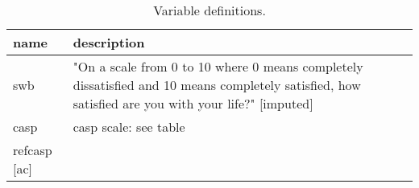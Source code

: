 \begin{table}[H]\centering\footnotesize
 \caption{\label{var_des} Variable definitions.}
\begin{tabular} {p{1.5in}p{4.5in}}   \hline
name & description   \\ \hline
  swb & "On a scale from 0 to 10 where 0 means completely dissatisfied and 10 means completely satisfied, how satisfied are you with your life?" [imputed] \\
  casp & casp scale: see table \\ref{casp} [ac] \\
\hline\end{tabular}\end{table}